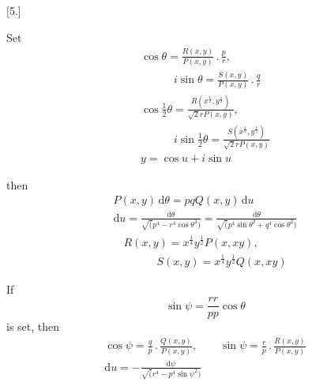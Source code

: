 \begingroup
\renewcommand{\arraystretch}{1.45}

\par\medskip{}\centerline{[5.]}\nobreak\smallskip
Set
\[
\begin{gathered}
\cos\theta=\frac{R(x,y)}{P(x,y)}\,.\,\frac{p}{r},
\\[8pt]\quad{}\qquad i\sin\theta=\frac{S(x,y)}{P(x,y)}\,.\,\frac{q}{r}
\\[8pt]
\cos\tfrac12\theta=\frac{R(x^{\frac12},y^{\frac12})}{\surd 2rP(x,y)},
\\[8pt]\quad{}\qquad i\sin\tfrac12\theta=\frac{S(x^{\frac12},y^{\frac12})}{\surd 2rP(x,y)}
\\[8pt]
y=\cos u+i\sin u
\end{gathered}
\]

then
\[
\begin{gathered}
P(x,y)\,\mathrm{d}\theta=pqQ(x,y)\,\mathrm{d}u
\\[8pt]
\mathrm{d}u=\frac{\mathrm{d}\theta}{\surd(p^4-r^4\cos\theta^2)}
=\frac{\mathrm{d}\theta}{\surd(p^4\sin\theta^2+q^4\cos\theta^2)}
\end{gathered}
\]
\[
\begin{gathered}R(x,y)=x^{\frac14}y^{\frac12}P(x,xy),
\\[8pt]\quad{}\qquad S(x,y)=x^{\frac14}y^{\frac12}Q(x,xy)\end{gathered}
\]

If
\[
\sin\psi=\frac{rr}{pp}\cos\theta
\]
is set, then
\[
\begin{gathered}
\cos\psi=\frac{q}{p}\,.\,\frac{Q(x,y)}{P(x,y)},
\qquad \sin\psi=\frac{r}{p}\,.\,\frac{R(x,y)}{P(x,y)}
\\[8pt]
\mathrm{d}u=-\frac{\mathrm{d}\psi}{\surd(r^4-p^4\sin\psi^2)}
\end{gathered}
\]

